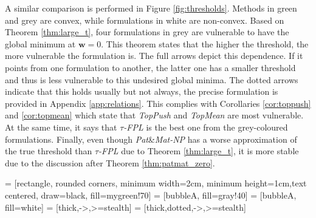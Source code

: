 \documentclass[]{interact}
\theoremstyle{plain}%
\theoremstyle{definition}
\theoremstyle{remark}
\newcommand{\toppush}{\emph{TopPush}\xspace}
\newcommand{\topmeank}{\emph{TopMean}\xspace}
\newcommand{\npB}{{\emph{Pat}\&\emph{Mat-NP}}\xspace}
\newcommand{\npC}{{\emph{$\tau$-FPL}}\xspace}
\begin{document}
A similar comparison is performed in Figure \ref{fig:thresholds}. Methods in green and grey are convex, while formulations in white are non-convex. Based on Theorem \ref{thm:large_t}, four formulations in grey are vulnerable to have the global minimum at $\bm w=0$. This theorem states that the higher the threshold, the more vulnerable the formulation is. The full arrows depict this dependence. If it points from one formulation to another, the latter one has a smaller threshold and thus is less vulnerable to this undesired global minima. The dotted arrows indicate that this holds usually but not always, the precise formulation is provided in Appendix \ref{app:relations}. This complies with Corollaries \ref{cor:toppush} and \ref{cor:topmean} which state that \toppush and \topmeank are most vulnerable. At the same time, it says that \npC is the best one from the grey-coloured formulations. %
Finally, even though \npB has a worse approximation of the true threshold than \npC due to Theorem \ref{thm:large_t}, it is more stable due to the discussion after Theorem \ref{thm:patmat_zero}.


 = [rectangle, rounded corners, minimum width=2cm, minimum height=1cm,text centered, draw=black, fill=mygreen!70]
 = [bubbleA, fill=gray!40]
 = [bubbleA, fill=white]
 = [thick,->,>=stealth]
 = [thick,dotted,->,>=stealth]
\end{document}
